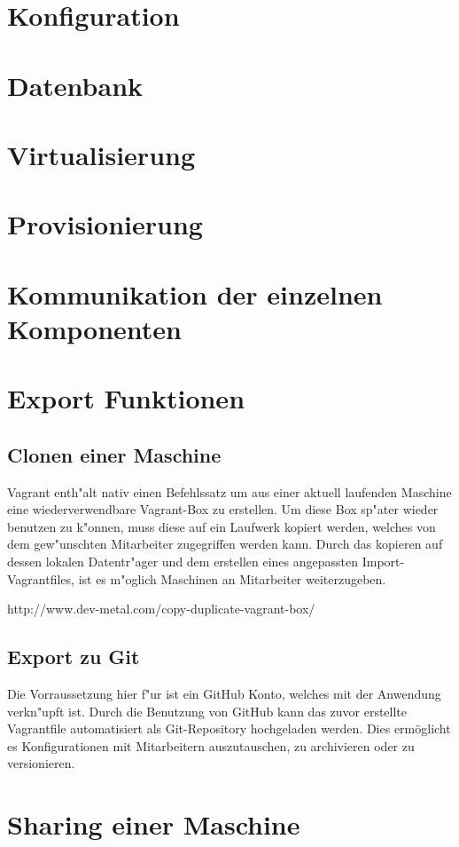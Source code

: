 \section{Konfiguration}
\section{Datenbank}
\section{Virtualisierung}
\section{Provisionierung}
\section{Kommunikation der einzelnen Komponenten}
\section{Export Funktionen}

\subsection{Clonen einer Maschine}
Vagrant enth"alt nativ einen Befehlssatz um aus einer aktuell laufenden Maschine eine wiederverwendbare Vagrant-Box zu erstellen.
Um diese Box sp"ater wieder benutzen zu k"onnen, muss diese auf ein Laufwerk kopiert werden, welches von dem gew"unschten Mitarbeiter zugegriffen werden kann. Durch das kopieren auf dessen lokalen Datentr"ager und dem erstellen eines angepassten Import-Vagrantfiles, ist es m"oglich Maschinen an Mitarbeiter weiterzugeben.

http://www.dev-metal.com/copy-duplicate-vagrant-box/

\subsection{Export zu Git}
Die Vorraussetzung hier f"ur ist ein GitHub Konto, welches mit der Anwendung verkn"upft ist. 
Durch die Benutzung von GitHub kann das zuvor erstellte Vagrantfile automatisiert als Git-Repository hochgeladen werden.
Dies ermöglicht es Konfigurationen mit Mitarbeitern auszutauschen, zu archivieren oder zu versionieren.


\section{Sharing einer Maschine}
